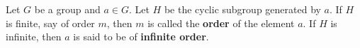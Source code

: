 Let $G$ be a group and $a \in G$. Let $H$ be the cyclic subgroup generated by $a$. If $H$ is finite, say of order $m$, then $m$ is called the \textbf{order} of the element $a$. If $H$ is infinite, then $a$ is said to be of \textbf{infinite order}.
